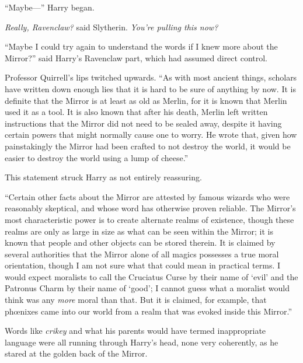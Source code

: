 “Maybe—” Harry began.

\emph{Really, Ravenclaw?} said Slytherin. \emph{You’re pulling this \emph{now}?}

“Maybe I could try again to understand the words if I knew more about the Mirror?” said Harry’s Ravenclaw part, which had assumed direct control.

Professor Quirrell’s lips twitched upwards. “As with most ancient things, scholars have written down enough lies that it is hard to be sure of anything by now. It is definite that the Mirror is at least as old as Merlin, for it is known that Merlin used it as a tool. It is also known that after his death, Merlin left written instructions that the Mirror did not need to be sealed away, despite it having certain powers that might normally cause one to worry. He wrote that, given how painstakingly the Mirror had been crafted to not destroy the world, it would be easier to destroy the world using a lump of cheese.”

This statement struck Harry as not entirely reassuring.

“Certain other facts about the Mirror are attested by famous wizards who were reasonably skeptical, and whose word has otherwise proven reliable. The Mirror’s most characteristic power is to create alternate realms of existence, though these realms are only as large in size as what can be seen within the Mirror; it is known that people and other objects can be stored therein. It is claimed by several authorities that the Mirror alone of all magics possesses a true moral orientation, though I am not sure what that could mean in practical terms. I would expect moralists to call the Cruciatus Curse by their name of ‘evil’ and the Patronus Charm by their name of ‘good’; I cannot guess what a moralist would think was any \emph{more} moral than that. But it is claimed, for example, that phœnixes came into our world from a realm that was evoked inside this Mirror.”

Words like \emph{crikey} and what his parents would have termed inappropriate language were all running through Harry’s head, none very coherently, as he stared at the golden back of the Mirror.

